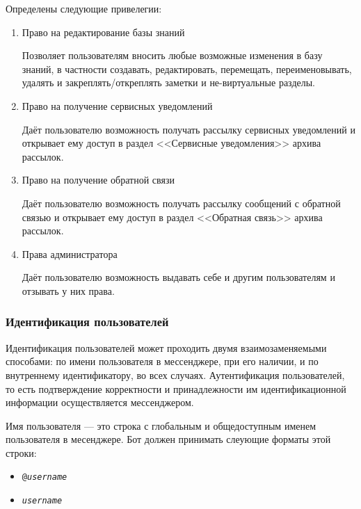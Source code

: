         Определены следующие привелегии:
        \begin{enumerate}
            \item \label{itm:req:sec:privs:kbedit}
                Право на редактирование базы знаний

                Позволяет пользователям вносить любые возможные изменения в базу знаний,
                в частности создавать, редактировать, перемещать, переименовывать, удалять
                и закреплять/откреплять заметки и не-виртуальные разделы.

            \item \label{itm:req:sec:privs:service}
                Право на получение сервисных уведомлений

                Даёт пользователю возможность получать рассылку сервисных уведомлений и открывает ему доступ
                в раздел <<Сервисные уведомления>> архива рассылок.

            \item \label{itm:req:sec:privs:feedback}
                Право на получение обратной связи

                Даёт пользователю возможность получать рассылку сообщений с обратной связью и
                открывает ему доступ в раздел <<Обратная связь>> архива рассылок.

            \item \label{itm:req:sec:privs:admin}
                Права администратора

                Даёт пользователю возможность выдавать себе и другим пользователям и
                отзывать у них права.
        \end{enumerate}

    \subsubsection{Идентификация пользователей}
        \label{sec:req:sec:id}
        Идентификация пользователей может проходить двумя взаимозаменяемыми способами:
        по имени пользователя в мессенджере, при его наличии, и по внутреннему идентификатору,
        во всех случаях. Аутентификация пользователей, то есть подтверждение корректности и
        принадлежности им идентификационной информации осуществляется мессенджером.

        Имя пользователя --- это строка с глобальным и общедоступным именем пользователя в месенджере.
        Бот должен принимать слеующие форматы этой строки:
        \begin{itemize}
            \item
                \texttt{@\textit{username}}
            \item
                \texttt{\textit{username}}
        \end{itemize}
        
